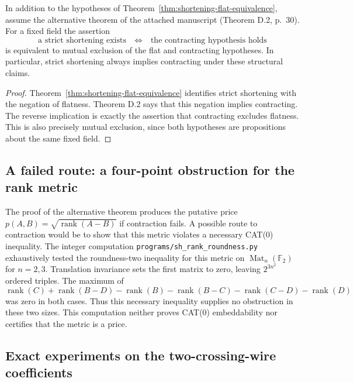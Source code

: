 \begin{corollary}
\label{cor:exclusivity-gate}
In addition to the hypotheses of Theorem~\ref{thm:shortening-flat-equivalence},
assume the alternative theorem of the attached manuscript
(Theorem D.2, p.~30).  For a fixed field the assertion
\[
 \text{a strict shortening exists}\quad\Longleftrightarrow\quad
 \text{the contracting hypothesis holds}
\]
is equivalent to mutual exclusion of the flat and contracting
hypotheses.  In particular, strict shortening always implies contracting
under these structural claims.
\end{corollary}
\begin{proof}
Theorem~\ref{thm:shortening-flat-equivalence} identifies strict shortening
with the negation of flatness.  Theorem D.2 says that this negation implies
contracting.  The reverse implication is exactly the assertion that
contracting excludes flatness.  This is also precisely mutual exclusion,
since both hypotheses are propositions about the same fixed field.
\end{proof}


\subsection{A failed route: a four-point obstruction for the rank metric}
\label{sec:rank-roundness-search}
The proof of the alternative theorem produces the putative price
$p(A,B)=\sqrt{\operatorname{rank}(A-B)}$ if contraction fails.  A possible
route to contraction would be to show that this metric violates a
necessary CAT(0) inequality.  The integer computation
\texttt{programs/sh\_rank\_roundness.py} exhaustively tested the
roundness-two inequality for this metric on $\operatorname{Mat}_n(\mathbb
F_2)$ for $n=2,3$.  Translation invariance sets the first matrix to zero,
leaving $2^{3n^2}$ ordered triples.  The maximum of
\[
 \operatorname{rank}(C)+\operatorname{rank}(B-D)
 -\operatorname{rank}(B)-\operatorname{rank}(B-C)
 -\operatorname{rank}(C-D)-\operatorname{rank}(D)
\]
was zero in both cases.  Thus this necessary inequality supplies no
obstruction in these two sizes.  This computation neither proves
CAT(0) embeddability nor certifies that the metric is a price.

\subsection{Exact experiments on the two-crossing-wire coefficients}
\label{sec:crossing-computations}

